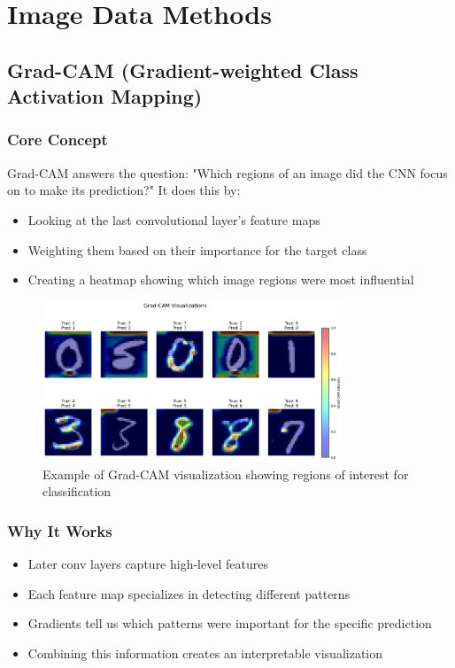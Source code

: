 \documentclass{article}
\begin{document}
\section{Image Data Methods}

\subsection{Grad-CAM (Gradient-weighted Class Activation Mapping)}

\subsubsection{Core Concept}
Grad-CAM answers the question: "Which regions of an image did the CNN focus on to make its prediction?" It does this by:
\begin{itemize}
    \item Looking at the last convolutional layer's feature maps
    \item Weighting them based on their importance for the target class
    \item Creating a heatmap showing which image regions were most influential
\end{itemize}

\begin{figure}[h]
    \centering
    \includegraphics[width=0.8\textwidth]{images/grad_cam.png}
    \caption{Example of Grad-CAM visualization showing regions of interest for classification}
    \label{fig:grad_cam}
\end{figure}

\subsubsection{Why It Works}
\begin{itemize}
    \item Later conv layers capture high-level features
    \item Each feature map specializes in detecting different patterns
    \item Gradients tell us which patterns were important for the specific prediction
    \item Combining this information creates an interpretable visualization
\end{itemize}
\end{document}
